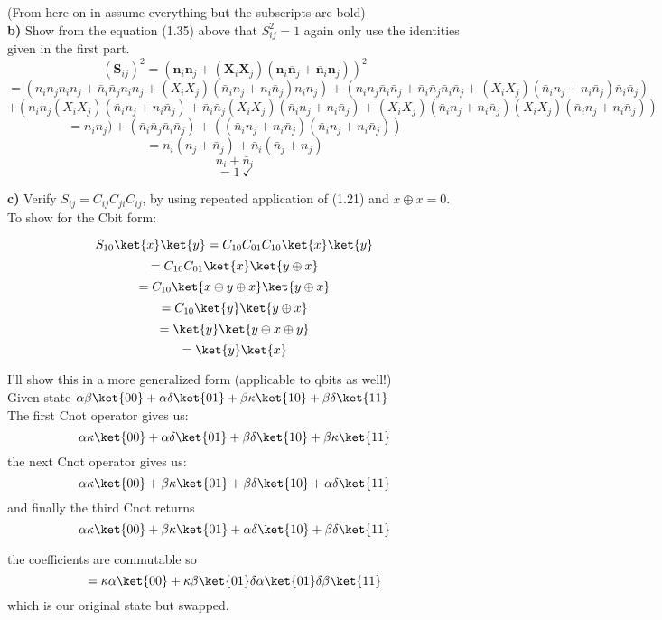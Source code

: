 (From here on in assume everything but the subscripts are bold)\\

\textbf{b)} Show from the equation (1.35) above that $S^2_{ij}=1$ again only use
the identities given in the first part.\\

$$(\textbf{S}_{ij})^2=(\textbf{n}_i\textbf{n}_j+(\textbf{X}_i\textbf{X}_j)(\textbf{n}_i\overline{\textbf{n}}_j+\overline{\textbf{n}}_i\textbf{n}_j))^2$$
$$=(n_in_jn_in_j+\bar n_i\bar n_j n_in_j +(X_iX_j)(\bar n_in_j+n_i\bar
n_j)n_in_j)
+(n_in_j\bar n_i\bar n_j + \bar n_i\bar n_j \bar n_i \bar
n_j+(X_iX_j)(\bar n_in_j+n_i\bar n_j)\bar n_i \bar n_j)$$
$$+(n_in_j(X_iX_j)(\bar n_in_j+n_i\bar n_j)+\bar n_i \bar n_j(X_iX_j)(\bar n_in_j+n_i\bar n_j)+(X_iX_j)(\bar n_in_j +n_i\bar n_j)(X_iX_j)(\bar n_in_j+n_i\bar n_j))$$
$$=n_in_j)+(\bar n_i\bar n_j \bar n_i \bar n_j)+((\bar n_i n_j +n_i\bar
n_j)(\bar n_in_j+n_i\bar n_j))$$
$$=n_i(n_j+\bar n_j)+\bar n_i(\bar n_j+n_j)$$
$$n_i+\bar n_i$$
$$=1~\checkmark$$

\textbf{c)} Verify $S_{ij}=C_{ij}C_{ji}C_{ij}$, by using repeated application of
(1.21) and $x\oplus x=0$.\\

To show for the Cbit form:

$$S_{10}\ket{x}\ket{y}=C_{10}C_{01}C_{10}\ket{x}\ket{y}$$
$$=C_{10}C_{01}\ket{x}\ket{y\oplus x}$$
$$=C_{10}\ket{x\oplus y\oplus x}\ket{y\oplus x}$$
$$=C_{10}\ket{y}\ket{y\oplus x}$$
$$=\ket{y}\ket{y\oplus x \oplus y}$$
$$=\ket{y}\ket{x}$$


I'll show this in a more generalized form (applicable to qbits as well!)\\

Given state
$\alpha\beta\ket{00}+\alpha\delta\ket{01}+\beta\kappa\ket{10}+\beta\delta\ket{11}$\\

The first Cnot operator gives us:
$$\alpha\kappa\ket{00}+\alpha\delta\ket{01}+\beta\delta\ket{10}+\beta\kappa\ket{11}$$
the next Cnot operator gives us:
$$\alpha\kappa\ket{00}+\beta\kappa\ket{01}+\beta\delta\ket{10}+\alpha\delta\ket{11}$$
and finally the third Cnot returns
$$\alpha\kappa\ket{00}+\beta\kappa\ket{01}+\alpha\delta\ket{10}+\beta\delta\ket{11}$$

the coefficients are commutable so
$$=\kappa\alpha\ket{00}+\kappa\beta\ket{01}\delta\alpha\ket{01}\delta\beta\ket{11}$$
which is our original state but swapped.\\

